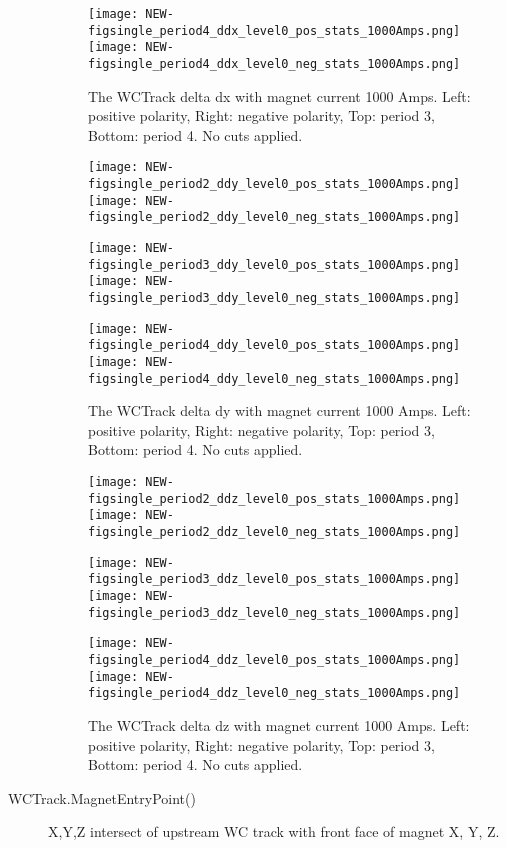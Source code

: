 \begin{description}
{\begin{figure}[h]
 	\texttt{[image: NEW-figsingle\_period4\_ddx\_level0\_pos\_stats\_1000Amps.png]}
	 \texttt{[image: NEW-figsingle\_period4\_ddx\_level0\_neg\_stats\_1000Amps.png]}
   \caption[short]{The WCTrack delta dx with magnet current 1000 Amps. Left: positive polarity, Right: negative polarity, Top: period 3, Bottom: period 4. No cuts applied.}
   \label{fig_ddx}
  \end{figure}
  
  
   \begin{figure}[h]	 
     \centering   
   
      	\texttt{[image: NEW-figsingle\_period2\_ddy\_level0\_pos\_stats\_1000Amps.png]}
	 \texttt{[image: NEW-figsingle\_period2\_ddy\_level0\_neg\_stats\_1000Amps.png]}
	 
   	\texttt{[image: NEW-figsingle\_period3\_ddy\_level0\_pos\_stats\_1000Amps.png]}
	 \texttt{[image: NEW-figsingle\_period3\_ddy\_level0\_neg\_stats\_1000Amps.png]}
	 
 	\texttt{[image: NEW-figsingle\_period4\_ddy\_level0\_pos\_stats\_1000Amps.png]}
	 \texttt{[image: NEW-figsingle\_period4\_ddy\_level0\_neg\_stats\_1000Amps.png]}
   \caption[short]{The WCTrack delta dy with magnet current 1000 Amps. Left: positive polarity, Right: negative polarity, Top: period 3, Bottom: period 4. No cuts applied.}
   \label{fig_ddy}
  \end{figure}
  
     \begin{figure}[h]	 
       \centering   
     
        	\texttt{[image: NEW-figsingle\_period2\_ddz\_level0\_pos\_stats\_1000Amps.png]}
	 \texttt{[image: NEW-figsingle\_period2\_ddz\_level0\_neg\_stats\_1000Amps.png]}
	 
   	\texttt{[image: NEW-figsingle\_period3\_ddz\_level0\_pos\_stats\_1000Amps.png]}
	 \texttt{[image: NEW-figsingle\_period3\_ddz\_level0\_neg\_stats\_1000Amps.png]}
	 
 	\texttt{[image: NEW-figsingle\_period4\_ddz\_level0\_pos\_stats\_1000Amps.png]}
	 \texttt{[image: NEW-figsingle\_period4\_ddz\_level0\_neg\_stats\_1000Amps.png]}
   \caption[short]{The WCTrack delta dz with magnet current 1000 Amps. Left: positive polarity, Right: negative polarity, Top: period 3, Bottom: period 4. No cuts applied.}
   \label{fig_ddz}
  \end{figure}

}
\item[WCTrack.MagnetEntryPoint()]{
X,Y,Z intersect of upstream WC track with front face of magnet  X, Y, Z.

}
\end{description}
